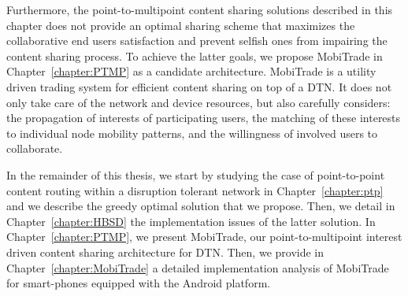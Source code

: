 Furthermore, the point-to-multipoint content sharing solutions described in this chapter does not provide an optimal sharing scheme that maximizes the collaborative end users satisfaction and prevent selfish ones from impairing the content sharing process. To achieve the latter goals, we propose MobiTrade in Chapter~\ref{chapter:PTMP} as a candidate architecture. MobiTrade is a utility driven trading system for efficient content sharing on top of a DTN. It does not only take care of the network and device resources, but also carefully considers: the propagation of interests of participating users, the matching of these interests to individual node mobility patterns, and the willingness of involved users to collaborate.

In the remainder of this thesis, we start by studying the case of point-to-point content routing within a disruption tolerant network in Chapter~\ref{chapter:ptp} and we describe the greedy optimal solution that we propose. Then, we detail in Chapter~\ref{chapter:HBSD} the implementation issues of the latter solution. In Chapter~\ref{chapter:PTMP}, we present MobiTrade, our point-to-multipoint interest driven content sharing architecture for DTN. Then, we provide in Chapter~\ref{chapter:MobiTrade} a detailed implementation analysis of MobiTrade for smart-phones equipped with the Android platform.



